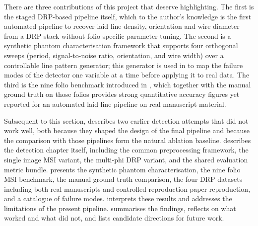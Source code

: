 There are three contributions of this project that deserve highlighting. The first
is the staged DRP-based pipeline itself, which to the author's
knowledge is the first automated pipeline to recover laid line
density, orientation and wire diameter from a DRP stack
without folio specific parameter tuning. The second is a synthetic
phantom characterisation framework that supports four orthogonal
sweeps (period, signal-to-noise ratio, orientation, and wire width)
over a controllable line pattern generator; this generator is used in
 to map the failure modes of the
detector one variable at a time before applying it to real data.
The third is the nine folio benchmark introduced in
, which together with the manual ground truth
on those folios provides strong quantitative accuracy figures
yet reported for an automated laid line pipeline on real manuscript
material.

Subsequent to this section,  describes
two earlier detection attempts that did not work
well, both because they shaped the design of the final pipeline
and because the comparison with those pipelines form the natural
ablation baseline.  describes the detection
chapter itself, including the common preprocessing framework, the
single image MSI variant, the multi-phi DRP variant, and the
shared evaluation metric bundle.  presents
the synthetic phantom characterisation, the nine folio MSI
benchmark, the manual ground truth comparison, the four
 DRP datasets including both real manuscripts and controlled reproduction paper
reproduction, and a catalogue of failure modes. 
interprets these results and addresses the limitations of the present
pipeline.  summarises the findings,
reflects on what worked and what did not, and lists candidate
directions for future work.
